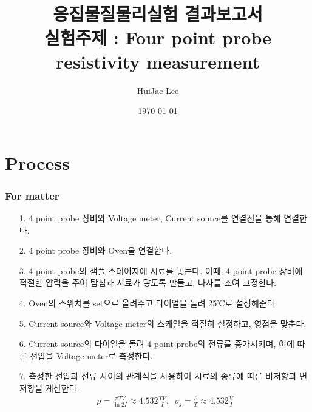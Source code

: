 \documentclass[aps,reprint,superscriptaddress,10pt]{revtex4-2}
\begin{document}
\title{응집물질물리실험 결과보고서 \\
\small 실험주제 : Four point probe resistivity
measurement}

\author{HuiJae-Lee}

\date{\today}

\begin{abstract}

  \end{abstract}

 \maketitle
 
 \section{Process}
 \subsubsection{For matter}
 \begin{itemize}
     \item[1. ]
     4 point probe 장비와 Voltage meter, Current source를 연결선을 통해 연결한다.
     \item[2. ]
     4 point probe 장비와 Oven을 연결한다.
     \item[3. ]
     4 point probe의 샘플 스테이지에 시료를 놓는다. 이때, 4 point probe 장비에 
     적절한 압력을 주어 탐침과 시료가 닿도록 만들고, 나사를 조여 고정한다. 
     \item[4. ]
     Oven의 스위치를 set으로 올려주고 다이얼을 돌려 25℃로 설정해준다.
     \item[5. ]
     Current source와 Voltage meter의 스케일을 적절히 설정하고, 영점을 맞춘다.
     \item[6. ]
     Current source의 다이얼을 돌려 4 point probe의 전류를 증가시키며, 
     이에 따른 전압을 Voltage meter로 측정한다.
     \item[7. ] 
     측정한 전압과 전류 사이의 관계식을 사용하여 시료의 종류에 
     따른 비저항과 면저항을 계산한다. 
     \begin{align}
         \rho = \frac{\pi TV}{\ln{2I}}\approx 4.532\frac{TV}{I},\,\,\,
         \rho_s = \frac{\rho}{T}\approx 4.532\frac{V}{I}
     \end{align}
 
 \end{itemize}
 
\end{document}
